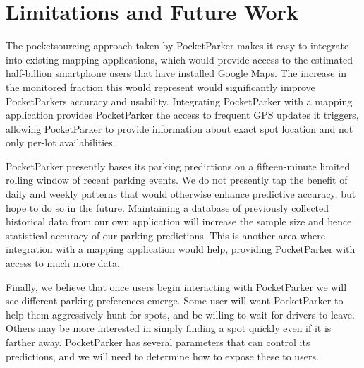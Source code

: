 \section{Limitations and Future Work}
\label{sec-future}

The pocketsourcing approach taken by PocketParker makes it easy to integrate
into existing mapping applications, which would provide access to the
estimated half-billion smartphone users that have installed Google Maps. The
increase in the monitored fraction this would represent would significantly
improve PocketParkers accuracy and usability. Integrating PocketParker with a
mapping application provides PocketParker the access to frequent GPS updates
it triggers, allowing PocketParker to provide information about exact spot
location and not only per-lot availabilities.

PocketParker presently bases its parking predictions on a fifteen-minute
limited rolling window of recent parking events. We do not presently tap the
benefit of daily and weekly patterns that would otherwise enhance predictive
accuracy, but hope to do so in the future. Maintaining a database of
previously collected historical data from our own application will increase
the sample size and hence statistical accuracy of our parking predictions.
This is another area where integration with a mapping application would help,
providing PocketParker with access to much more data.

Finally, we believe that once users begin interacting with PocketParker we
will see different parking preferences emerge. Some user will want
PocketParker to help them aggressively hunt for spots, and be willing to wait
for drivers to leave. Others may be more interested in simply finding a spot
quickly even if it is farther away. PocketParker has several parameters that
can control its predictions, and we will need to determine how to expose
these to users.

%
%
%
%
%
%
%
